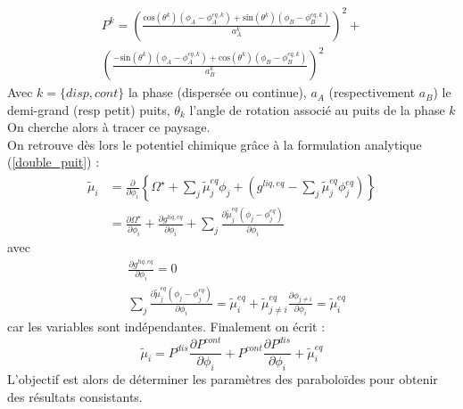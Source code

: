 \documentclass[a4paper,11pt,fleqn]{report}    %
\newcommand{\co}[1]{\text{cos}\left(#1\right)}
\newcommand{\sinus}[1]{\text{sin}\left(#1\right)}
\begin{document}
\begin{multline}
	P^{k}=\left(\frac{\co{\theta^{k}}(\phi_{A}-\phi_{A}^{eq,k}) + \sinus{\theta^{k}}(\phi_{B}-\phi_{B}^{eq,k})}{a_{A}^{k}}\right)^{2}+\\ \left(\frac{-\sinus{\theta^{k}}(\phi_{A}-\phi_{A}^{eq,k}) + \co{\theta^{k}}(\phi_{B}-\phi_{B}^{eq,k})}{a_{B}^{k}}\right)^{2}
	\label{eq:paraboloid_general_}
\end{multline} 
Avec $k = \{disp,cont\}$ la phase (dispersée ou continue), $a_A$ (respectivement $a_B$) le demi-grand (resp petit) puits, $\theta_k$ l'angle de rotation associé au puits de la phase $k$\\
On cherche alors à tracer ce paysage. \\
On retrouve dès lors le potentiel chimique grâce à la formulation analytique (\ref{double_puit}) :
\begin{align*}
	\tilde{\mu}_i &= \frac{\partial}{\partial \phi_i}\left\lbrace 
	\Omega^{\star} + \sum_j \tilde{\mu}_j^{eq}\phi_j + \left( {g}^{liq,eq} -  \sum_j \tilde{\mu}_j^{eq}\phi_j^{eq} \right)\right\rbrace \\
	&= \frac{\partial \Omega^{\star}}{\partial \phi_i} + \frac{\partial g^{liq,eq}}{\partial \phi_i} + \sum_j \frac{\partial \tilde{\mu}_j^{eq}\left(\phi_j - \phi_j^{eq}\right)}{\partial  \phi_i}
\end{align*}
avec 
\begin{align*}
	& \frac{\partial g^{liq,eq}}{\partial \phi_i} = 0 \\
		& \sum_j \frac{\partial \tilde{\mu}_j^{eq}\left(\phi_j - \phi_j^{eq}\right)}{\partial  \phi_i} = \tilde{\mu}_i^{eq} +\tilde{\mu}_{j\neq i}^{eq} \frac{\partial \phi_{j\neq i}}{\partial \phi_i} = \tilde{\mu}_i^{eq}
\end{align*}
car les variables sont indépendantes. Finalement on écrit :
\begin{equation}
\tilde{\mu}_i =	P^{dis}\frac{\partial P^{cont}}{\partial \phi_i} + P^{cont}\frac{\partial P^{dis}}{\partial \phi_i} + \tilde{\mu}_i^{eq}
\end{equation}
L'objectif est alors de déterminer les paramètres des paraboloïdes pour obtenir des résultats consistants.
\end{document}

